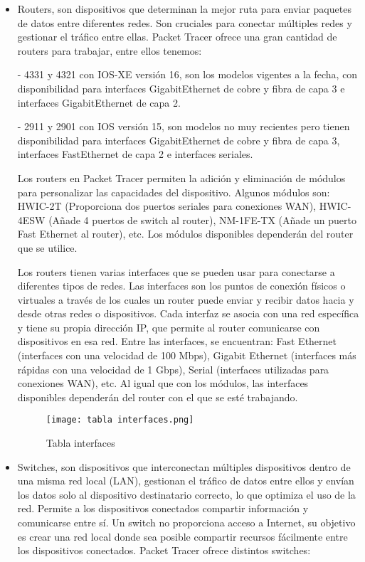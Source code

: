 \documentclass{article}
\begin{document}
\begin{itemize}
    \item Routers, son dispositivos que determinan la mejor ruta para enviar paquetes de datos entre diferentes redes. Son cruciales para conectar múltiples redes y gestionar el tráfico entre ellas. Packet Tracer ofrece una gran cantidad de routers para trabajar, entre ellos tenemos: 

    - 4331 y 4321 con IOS-XE versión 16, son los modelos vigentes a la fecha, con disponibilidad para interfaces GigabitEthernet de cobre y fibra de capa 3 e interfaces GigabitEthernet de capa 2.

    -  2911 y 2901 con IOS versión 15, son modelos no muy recientes pero tienen disponibilidad para interfaces GigabitEthernet de cobre y fibra de capa 3, interfaces FastEthernet de capa 2 e interfaces seriales.
    
    Los routers en Packet Tracer permiten la adición y eliminación de módulos para personalizar las capacidades del dispositivo. Algunos módulos son: HWIC-2T (Proporciona dos puertos seriales para conexiones WAN), HWIC-4ESW (Añade 4 puertos de switch al router), NM-1FE-TX (Añade un puerto Fast Ethernet al router), etc. Los módulos disponibles dependerán del router que se utilice.

    Los routers tienen varias interfaces que se pueden usar para conectarse a diferentes tipos de redes. Las interfaces son los puntos de conexión físicos o virtuales a través de los cuales un router puede enviar y recibir datos hacia y desde otras redes o dispositivos. Cada interfaz se asocia con una red específica y tiene su propia dirección IP, que permite al router comunicarse con dispositivos en esa red. Entre las interfaces, se encuentran: Fast Ethernet (interfaces con una velocidad de 100 Mbps), Gigabit Ethernet (interfaces más rápidas con una velocidad de 1 Gbps), Serial (interfaces utilizadas para conexiones WAN), etc. Al igual que con los módulos, las interfaces disponibles dependerán del router con el que se esté trabajando.

    \begin{figure}[h]
  \centering
  \texttt{[image: tabla interfaces.png]}
  \caption{Tabla interfaces}
    \end{figure}

    \item Switches, son dispositivos que interconectan múltiples dispositivos dentro de una misma red local (LAN), gestionan el tráfico de datos entre ellos y envían los datos solo al dispositivo destinatario correcto, lo que optimiza el uso de la red. Permite a los dispositivos conectados compartir información y comunicarse entre sí. Un switch no proporciona acceso a Internet, su objetivo es crear una red local donde sea posible compartir recursos fácilmente entre los dispositivos conectados. Packet Tracer ofrece distintos switches:
    

\end{itemize}
\end{document}
